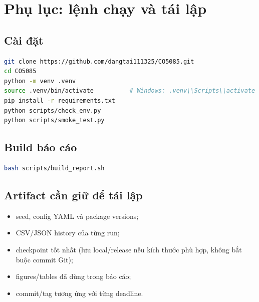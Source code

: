 \appendix
\section{Phụ lục: lệnh chạy và tái lập}

\subsection{Cài đặt}
\begin{lstlisting}[language=bash]
git clone https://github.com/dangtai111325/CO5085.git
cd CO5085
python -m venv .venv
source .venv/bin/activate          # Windows: .venv\\Scripts\\activate
pip install -r requirements.txt
python scripts/check_env.py
python scripts/smoke_test.py
\end{lstlisting}

\subsection{Build báo cáo}
\begin{lstlisting}[language=bash]
bash scripts/build_report.sh
\end{lstlisting}

\subsection{Artifact cần giữ để tái lập}
\begin{itemize}
\item seed, config YAML và package versions;
\item CSV/JSON history của từng run;
\item checkpoint tốt nhất (lưu local/release nếu kích thước phù hợp, không bắt buộc commit Git);
\item figures/tables đã dùng trong báo cáo;
\item commit/tag tương ứng với từng deadline.
\end{itemize}
